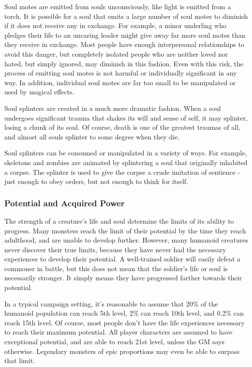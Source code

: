       Soul motes are emitted from souls unconsciously, like light is emitted from a torch.
      It is possible for a soul that emits a large number of soul motes to diminish if it does not receive any in exchange.
      For example, a minor underling who pledges their life to an uncaring leader might give away far more soul motes than they receive in exchange.
      Most people have enough interpersonal relationships to avoid this danger, but completely isolated people who are neither loved nor hated, but simply ignored, may diminish in this fashion.
      Even with this risk, the process of emitting soul motes is not harmful or individually significant in any way.
      In addition, individual soul motes are far too small to be manipulated or used by magical effects.

      Soul splinters are created in a much more dramatic fashion.
      When a soul undergoes significant trauma that shakes its will and sense of self, it may splinter, losing a chunk of its soul.
      Of course, death is one of the greatest traumas of all, and almost all souls splinter to some degree when they die.

      Soul splinters can be consumed or manipulated in a variety of ways.
      For example, skeletons and zombies are animated by splintering a soul that originally inhabited a corpse.
      The splinter is used to give the corpse a crude imitation of sentience - just enough to obey orders, but not enough to think for itself.

    \subsubsection{Potential and Acquired Power}
      The strength of a creature's life and soul determine the limits of its ability to progress.
      Many monsters reach the limit of their potential by the time they reach adulthood, and are unable to develop further.
      However, many humanoid creatures never discover their true limits, because they have never had the necessary experiences to develop their potential.
      A well-trained soldier will easily defeat a commoner in battle, but this does not mean that the soldier's life or soul is necessarily stronger.
      It simply means they have progressed farther towards their potential.

      In a typical campaign setting, it's reasonable to assume that 20\% of the humanoid population can reach 5th level, 2\% can reach 10th level, and 0.2\% can reach 15th level.
      Of course, most people don't have the life experiences necessary to reach their maximum potential.
      All player characters are assumed to have exceptional potential, and are able to reach 21st level, unless the GM says otherwise.
      Legendary monsters of epic proportions may even be able to surpass that limit.

